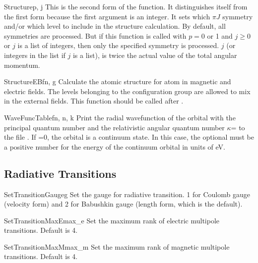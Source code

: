 \begin{fundesc}{Structure}{p, j}
This is the second form of the  function. It distinguishes
itself from the first form because the first argument is an integer. It sets
which $\pi J$ symmetry and/or which level to include in the structure
calculation. By default, all symmetries are processed. But if this function is
called with $p=0$ or 1 and $j \ge 0$ or $j$ is a list of integers, then only the
specified symmetry is processed. $j$ (or integers in the list if $j$ is a list),
is  twice the actual value of the total angular momentum.
\end{fundesc}

\begin{fundesc}{StructureEB}{fn, g}
Calculate the atomic structure for atom in magnetic and electric fields. The
levels belonging to the configuration group  are allowed to mix in the
external fields. This function should be called after .
\end{fundesc}

\begin{fundesc}{WaveFuncTable}{fn, n, k}
Print the radial wavefunction of the orbital with the principal quantum number
 and the relativistic angular quantum number $\kappa$= to the file
. If =0, the orbital is a continuum state. In this case, the
optional  must be a positive number for the energy of the continuum
orbital in units of eV.
\end{fundesc}


\subsection{Radiative Transitions}

\begin{fundesc}{SetTransitionGauge}{g}
Set the gauge for radiative transition. 1 for Coulomb gauge (velocity form) and
2 for Babushkin gauge (length form, which is the default). 
\end{fundesc}

\begin{fundesc}{SetTransitionMaxE}{max\_e}
Set the maximum rank of electric multipole transitions. Default is 4.
\end{fundesc}

\begin{fundesc}{SetTransitionMaxM}{max\_m}
Set the maximum rank of magnetic multipole transitions. Default is 4.
\end{fundesc}

